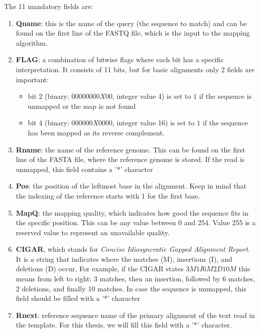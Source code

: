 The 11 mandatory fields are:
\begin{enumerate}
	
	\item \textbf{Qname}: this is the name of the query (the sequence to match) and can be found on the first line of the FASTQ file, which is the input to the mapping algorithm.
	
	\item \textbf{FLAG}: a combination of bitwise flags where each bit has a specific interpretation. It consists of 11 bits, but for basic alignments only 2 fields are important:
	\begin{itemize}
		\item bit 2 (binary: $00000000X00$, integer value 4) is set to $1$ if the sequence is unmapped or the map is not found
		\item bit 4 (binary: $000000X0000$, integer value 16) is set to $1$ if the sequence has been mapped as its reverse complement.
	\end{itemize}
	
	\item \textbf{Rname}: the name of the reference genome. This can be found on the first line of the FASTA file, where the reference genome is stored. If the read is unmapped, this field contains a '*' character
	
	\item \textbf{Pos}: the position of the leftmost base in the alignment. Keep in mind that the indexing of the reference starts with 1 for the first base.
	
	\item \textbf{MapQ}: the mapping quality, which indicates how good the sequence fits in the specific position. This can be any value between 0 and 254. Value 255 is a reserved value to represent an unavailable quality.
	
	\item \textbf{CIGAR}, which stands for \textit{Concise Idiosyncratic Gapped Alignment Report}. It is a string that indicates where the matches (M), insertions (I), and deletions (D) occur. For example, if the CIGAR states $3M1I6M2D10M$ this means from left to right: 3 matches, then an insertion, followed by 6 matches, 2 deletions, and finally 10 matches. In case the sequence is unmapped, this field should be filled with a '*' character
	
	\item \textbf{Rnext}: reference sequence name of the primary alignment of the text read in the template. For this thesis, we will fill this field with a '*' character. 
	

\end{enumerate}
